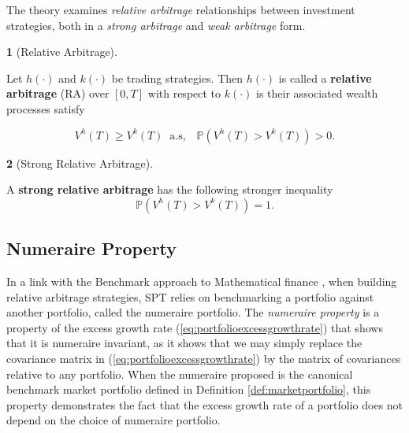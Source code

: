 \documentclass[british]{amsart} \usepackage{lmodern}
\numberwithin{equation}{section} \numberwithin{figure}{section}
\theoremstyle{plain} \newtheorem{thm}{\protect\theoremname}[section]
\theoremstyle{definition} \newtheorem{defn}[thm]{\protect\definitionname}
\theoremstyle{plain} \newtheorem{assumption}[thm]{\protect\assumptionname}
\theoremstyle{plain} \newtheorem{lem}[thm]{\protect\lemmaname}
\theoremstyle{plain} \newtheorem{prop}[thm]{\protect\propositionname}
\theoremstyle{remark} \newtheorem{rem}[thm]{\protect\remarkname}
\theoremstyle{plain} \newtheorem{cor}[thm]{\protect\corollaryname}
\begin{document}
The theory examines \textit{relative arbitrage} relationships between investment
strategies, both in a \textit{strong arbitrage} and \textit{weak arbitrage}
form.

\begin{defn} [Relative Arbitrage]
  \label{def:defstrongrelativearbitrage}

  Let $h(\cdot)$ and $k(\cdot)$ be trading strategies. Then
  $h(\cdot)$ is called a \textbf{relative arbitrage} (RA) over
  $[0,T]$ with respect to $k(\cdot)$ is their associated wealth
  processes satisfy

  \begin{equation}
    V^{h}(T)\ge V^{k}(T)\;\;\text{a.s},\;\;\;\mathbb{P}(V^{h}(T)>V^{k}(T))>0.
  \end{equation}
\end{defn}

\begin{defn} [Strong Relative Arbitrage]
  \label{def:defstrongrelativearbitrage}

  A \textbf{strong relative arbitrage} has the following stronger inequality
  \begin{equation}
    \mathbb{P}(V^{h}(T)>V^{k}(T))=1.
  \end{equation}
\end{defn}

\subsection{Numeraire Property}

In a link with the Benchmark approach to Mathematical finance \cite{platen2006},
when building relative arbitrage strategies, SPT relies on benchmarking a
portfolio against another portfolio, called the numeraire portfolio. The
\textit{numeraire property} is a property of the excess growth rate
(\ref{eq:portfolioexcessgrowthrate}) that shows that it is numeraire invariant,
as it shows that we may simply replace the covariance matrix in
(\ref{eq:portfolioexcessgrowthrate}) by the matrix of covariances relative to
any portfolio. When the numeraire proposed is the canonical benchmark market
portfolio defined in Definition \ref{def:marketportfolio}, this property
demonstrates the fact that the excess growth rate of a portfolio does not depend
on the choice of numeraire portfolio.
\end{document}
